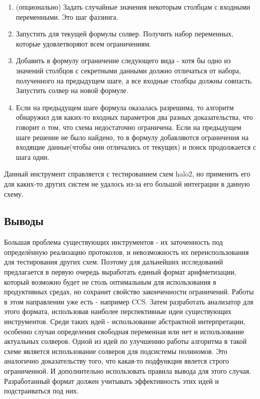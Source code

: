 \documentclass[a4paper]{article}
\begin{document}
\begin{enumerate}
    \item (опционально) Задать случайные значения некоторым столбцам с входными переменными. Это шаг фаззинга.
    \item Запустить для текущей формулы солвер. Получить набор переменных, которые удовлетворяют всем ограничениям.
    \item Добавить в формулу ограничение следующего вида - хотя бы одно из значений столбцов с секретными данными должно отличаться от набора, полученного на предыдущем шаге, а все входные столбцы должны совпасть. Запустить солвер на новой формуле.
    \item Если на предыдущем шаге формула оказалась разрешима, то алгоритм обнаружил для каких-то входных параметров два разных доказательства, что говорит о том, что схема недостаточно ограничена. Если на предыдущем шаге решение не было найдено, то в формулу добавляются ограничения на входящие данные(чтобы они отличались от текущих) и поиск продолжается с шага один.
\end{enumerate}

Данный инструмент справляется с тестированием схем halo2, но применить его для каких-то других систем не удалось из-за его большой интеграции в данную схему.

\subsection{Выводы}
\indent

Большая проблема существующих инструментов - их заточенность под определённую реализацию протоколов, и невозможность их переиспользования для тестирования других схем. Поэтому для дальнейших исследований предлагается в первую очередь выработать единый формат арифметизации, который возможно будет не столь оптимальным для использования в продуктивных средах, но сохранит свойство законченности ограничений. Работы в этом направлении уже есть - например CCS\cite{litlink18}. Затем разработать анализатор для этого формата, использовав наиболее перспективные идеи существующих инструментов. Среди таких идей - использование абстрактной интерпретации, особенно случаи определения свободная переменная или нет и использование актуальных солверов. Одной из идей по улучшению работы алгоритма в такой схеме является использование солверов для подсистемы полиномов. Это аналогично доказательству того, что какая-то подфункция явлется строго ограниченной. И дополнительно использовать правила вывода для этого случая. Разработанный формат должен учитывать эффективность этих идей и подстраиваться под них.
\end{document}
